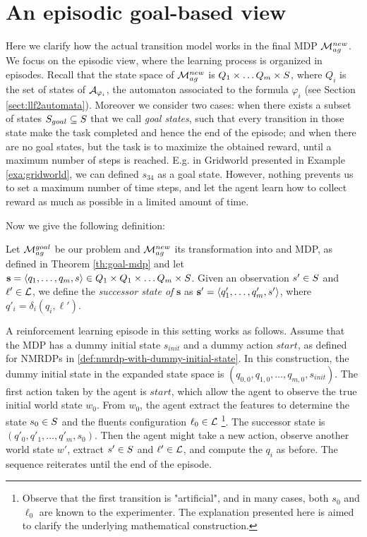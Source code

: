 \section{An episodic goal-based view}
Here we clarify how the actual transition model works in the final MDP $\mathcal{M}_{ag}^{new}$. We focus on the episodic view, where the learning process is organized in episodes.
Recall that the state space of $\mathcal{M}_{ag}^{new}$ is $Q_1\times \dots Q_m \times S$, where $Q_i$ is the set of states of $\mathcal{A}_{\varphi_i}$, the automaton associated to the \LLf formula $\varphi_i$ (see Section \ref{sect:llf2automata}). 
Moreover we consider two cases: when there exists a subset of states $S_{goal} \subseteq S$ that we call \emph{goal states}, such that every transition in those state make the task completed and hence the end of the episode; and when there are no goal states, but the task is to maximize the obtained reward, until a maximum number of steps is reached. E.g. in Gridworld presented in Example \ref{exa:gridworld}, we can defined $s_{34}$ as a goal state. However, nothing prevents us to set a maximum number of time steps, and let the agent learn how to collect reward as much as possible in a limited amount of time.

Now we give the following definition:
\begin{definition}
	Let $\mathcal{M}_{ag}^{goal}$ be our problem and $\mathcal{M}_{ag}^{new}$ its transformation into and MDP, as defined in Theorem \ref{th:goal-mdp} and let $\mathbf{s}=\langle q_1, \dots, q_m, s \rangle\in Q_1\times Q_1\times \dots Q_m \times S$. Given an observation $s'\in S$ and $\ell'\in\mathcal{L}$, we define the \emph{successor state of} $\mathbf{s}$ as $\mathbf{s'}=\langle q'_1, \dots, q'_m, s' \rangle$, where $q'_i = \delta_i(q_i, \ell')$.
\end{definition}
	
A reinforcement learning episode in this setting works as follows. Assume that the MDP has a dummy initial state $s_{init}$ and a dummy action $start$, as defined for NMRDPs in \ref{def:nmrdp-with-dummy-initial-state}. In this construction, the dummy initial state in the expanded state space is $(q_{0,0}, q_{1,0}, \dots, q_{m, 0}, s_{init})$. 
The first action taken by the agent is $start$, which allow the agent to observe the true initial world state $w_0$. 
From $w_0$, the agent extract the features to determine the state $s_0\in S$ and the fluents configuration $\ell_0\in \mathcal{L}$
\footnote{Observe that the first transition is "artificial", and in many cases, both $s_0$ and $\ell_0$ are known to the experimenter. The explanation presented here is aimed to clarify the underlying mathematical construction.}. The successor state is $(q'_{0}, q'_{1}, \dots, q'_{m}, s_0)$. Then the agent might take a new action, observe another world state $w'$, extract $s'\in S$ and $\ell'\in\mathcal{L}$, and compute the $q_i$ as before. The sequence reiterates until the end of the episode.

